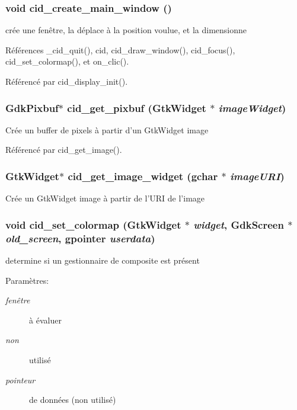 \subsubsection{\setlength{\rightskip}{0pt plus 5cm}void cid\_\-create\_\-main\_\-window ()}\label{cid-main_8h_2640d4b07379342354919e9a4ca1dae4}


crée une fenêtre, la déplace à la position voulue, et la dimensionne 

Références \_\-cid\_\-quit(), cid, cid\_\-draw\_\-window(), cid\_\-focus(), cid\_\-set\_\-colormap(), et on\_\-clic().

Référencé par cid\_\-display\_\-init().
\subsubsection{\setlength{\rightskip}{0pt plus 5cm}GdkPixbuf$\ast$ cid\_\-get\_\-pixbuf (GtkWidget $\ast$ {\em imageWidget})}\label{cid-main_8h_bc0aec7dc3c1566c92317817962763c7}


Crée un buffer de pixels à partir d'un GtkWidget image 

Référencé par cid\_\-get\_\-image().
\subsubsection{\setlength{\rightskip}{0pt plus 5cm}GtkWidget$\ast$ cid\_\-get\_\-image\_\-widget (gchar $\ast$ {\em imageURI})}\label{cid-main_8h_a80c8d1a838f92796cbc0706de88a394}


Crée un GtkWidget image à partir de l'URI de l'image 
\subsubsection{\setlength{\rightskip}{0pt plus 5cm}void cid\_\-set\_\-colormap (GtkWidget $\ast$ {\em widget}, \/  GdkScreen $\ast$ {\em old\_\-screen}, \/  gpointer {\em userdata})}\label{cid-main_8h_2839de6472a3afc45911b4856e156443}


determine si un gestionnaire de composite est présent \begin{Desc}
\item[Paramètres:]
\begin{description}
\item[{\em fenêtre}]à évaluer \item[{\em non}]utilisé \item[{\em pointeur}]de données (non utilisé) \end{description}
\end{Desc}


